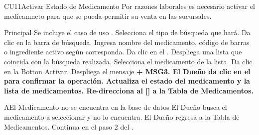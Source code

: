 \begin{UseCase}{CU11}{Activar Estado de Medicamento}{
		Por razones laborales es necesario activar el medicamneto para que se pueda permitir su venta en las sucursales.
	}
	\end{UseCase}
	\begin{UCtrayectoria}{Principal}
		\UCpaso Se incluye el caso de uso .
		\UCpaso[\UCactor] Selecciona el tipo de búsqueda que hará.
		\UCpaso[\UCactor] Da clic en la barra de búsqueda.
		\UCpaso [\UCactor] Ingresa nombre del medicamento, código de barras o ingrediente activo según corresponda. 
		\UCpaso[\UCactor] Da clic en el .
		\UCpaso Despliega una lista que coincida con la búsqueda realizada. 
		\UCpaso[\UCactor] Selecciona el medicamento de la lista.
		\UCpaso[\UCactor] Da clic en la  {Botton Activar}.
		\UCpaso Despliega el mensaje \bf {+ MSG3}.
		\UCpaso[\UCactor] El Dueño da clic en el  para confirmar la operación.
		\UCpaso Actualiza el estado del medicamento y la lista de medicamentos.
		\UCpaso Re-direcciona al [\UCactor] a la  {Tabla de Medicamentos}.
	
	\end{UCtrayectoria}


\begin{UCtrayectoriaA}{A}{El Medicamento no se encuentra en la base de datos}
			\UCpaso[\UCactor] El Dueño busca el medicamento a seleccionar y no lo encuentra.
			\UCpaso[\UCactor] El Dueño regresa a la  {Tabla de Medicamentos}.
			\UCpaso Continua en el paso 2 del .
\end{UCtrayectoriaA}
		

